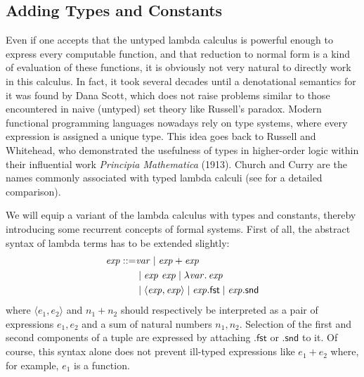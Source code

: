 
\subsection{Adding Types and Constants}
\label{sec:adding-types}

Even if one accepts that the untyped lambda calculus is powerful enough to
express every computable function, and that reduction to normal form is a kind
of evaluation of these functions, it is obviously not very natural to directly
work in this calculus. In fact, it took several decades until a denotational
semantics for it was found by Dana Scott, which does not raise problems similar
to those encountered in naive (untyped) set theory like Russell's paradox.
Modern functional programming languages nowadays rely on type systems, where
every expression is assigned a unique type. This idea goes back to Russell and
Whitehead, who demonstrated the usefulness of types in higher-order logic within
their influential work \emph{Principia Mathematica} (1913). Church and Curry are
the names commonly associated with typed lambda calculi (see \cite{Barendregt92}
for a detailed comparison).

We will equip a variant of the lambda calculus with types and constants,
thereby introducing some recurrent concepts of formal systems. First of all, the
abstract syntax of lambda terms has to be extended slightly:
\begin{equation}
  \label{eq:type-lambda-syn}
  \begin{split}
    \mathit{exp} ::= &\mathit{var}     \;|\; \mathit{exp} + \mathit{exp} \\
    & \;|\; \mathit{exp}\ \mathit{exp} \;|\;
    {\lambda \mathit{var}.\,\mathit{exp}} \\
    & \;|\; \langle\mathit{exp}, \mathit{exp}\rangle \;|\; \mathit{exp}.\mathsf{fst}
    \;|\; \mathit{exp}.\mathsf{snd}
  \end{split}
\end{equation}
where $\langle e_1, e_2\rangle$ and $n_1 + n_2$ should respectively be interpreted as a pair
of expressions $e_1, e_2$ and a sum of natural numbers $n_1, n_2$.  Selection of
the first and second components of a tuple are expressed by attaching
$.\mathsf{fst}$ or $.\mathsf{snd}$ to it.  Of course, this syntax alone does not
prevent ill-typed expressions like $e_1 + e_2$ where, for example, $e_1$ is a
function.

